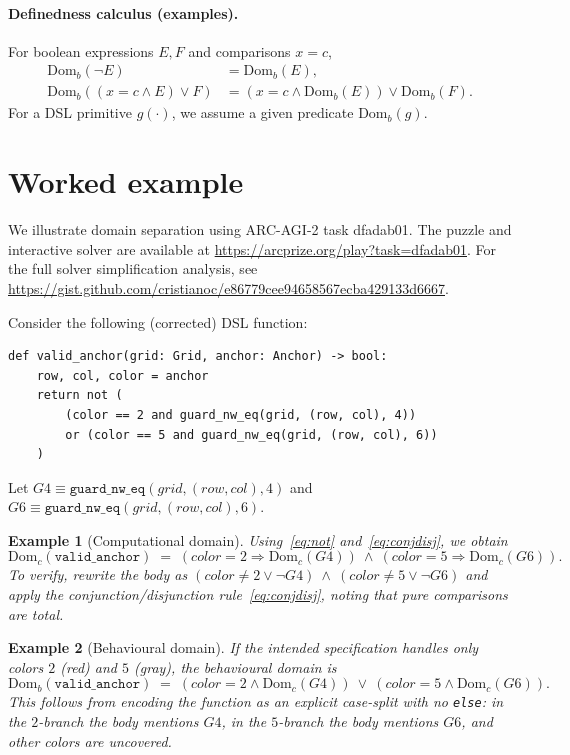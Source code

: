\documentclass[11pt]{article}
\newtheorem{example}{Example}
\newcommand{\Domc}{\mathrm{Dom}_c}
\newcommand{\Domb}{\mathrm{Dom}_b}
\begin{document}
\paragraph{Definedness calculus (examples).}
For boolean expressions $E,F$ and comparisons $x{=}c$,
\begin{align}
\Domb(\lnot E) &= \Domb(E), \label{eq:not}\\
\Domb((x{=}c \land E) \lor F) &= (x{=}c \land \Domb(E)) \lor \Domb(F). \label{eq:conjdisj}
\end{align}
For a DSL primitive $g(\cdot)$, we assume a given predicate $\Domb(g)$.

\section{Worked example}

We illustrate domain separation using ARC-AGI-2 task dfadab01. The puzzle and interactive solver are available at \url{https://arcprize.org/play?task=dfadab01}. For the full solver simplification analysis, see \url{https://gist.github.com/cristianoc/e86779cee94658567ecba429133d6667}.

Consider the following (corrected) DSL function:
\begin{lstlisting}
def valid_anchor(grid: Grid, anchor: Anchor) -> bool:
    row, col, color = anchor
    return not (
        (color == 2 and guard_nw_eq(grid, (row, col), 4))
        or (color == 5 and guard_nw_eq(grid, (row, col), 6))
    )
\end{lstlisting}
Let $G4 \equiv \texttt{guard\_nw\_eq}(grid,(row,col),4)$ and $G6 \equiv \texttt{guard\_nw\_eq}(grid,(row,col),6)$.

\begin{example}[Computational domain]
Using~\eqref{eq:not} and~\eqref{eq:conjdisj}, we obtain
\[
\Domc(\texttt{valid\_anchor})
\;=\;
(color{=}2 \Rightarrow \Domc(G4)) \ \land\ (color{=}5 \Rightarrow \Domc(G6)).
\]
To verify, rewrite the body as $(color{\neq}2 \lor \lnot G4)\ \land\ (color{\neq}5 \lor \lnot G6)$ and apply the conjunction/disjunction rule~\eqref{eq:conjdisj}, noting that pure comparisons are total.
\end{example}

\begin{example}[Behavioural domain]
If the intended specification handles only colors $2$ (red) and $5$ (gray), the behavioural domain is
\[
\Domb(\texttt{valid\_anchor})
\;=\;
(color{=}2 \land \Domc(G4)) \ \lor\ (color{=}5 \land \Domc(G6)).
\]
This follows from encoding the function as an explicit case-split with no \texttt{else}: in the $2$-branch the body mentions $G4$, in the $5$-branch the body mentions $G6$, and other colors are uncovered.
\end{example}
\end{document}
